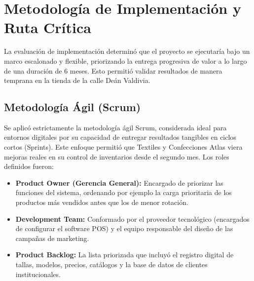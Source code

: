 \section{Metodología de Implementación y Ruta Crítica}

La evaluación de implementación determinó que el proyecto se ejecutaría bajo un marco escalonado y flexible, priorizando la entrega progresiva de valor a lo largo de una duración de 6 meses. Esto permitió validar resultados de manera temprana en la tienda de la calle Deán Valdivia.

\subsection{Metodología Ágil (Scrum)}
Se aplicó estrictamente la metodología ágil Scrum, considerada ideal para entornos digitales por su capacidad de entregar resultados tangibles en ciclos cortos (Sprints). Este enfoque permitió que Textiles y Confecciones Atlas viera mejoras reales en su control de inventarios desde el segundo mes. 
Los roles definidos fueron:
\begin{itemize}
    \item \textbf{Product Owner (Gerencia General):} Encargado de priorizar las funciones del sistema, ordenando por ejemplo la carga prioritaria de los productos más vendidos antes que los de menor rotación.
    \item \textbf{Development Team:} Conformado por el proveedor tecnológico (encargados de configurar el software POS) y el equipo responsable del diseño de las campañas de marketing.
    \item \textbf{Product Backlog:} La lista priorizada que incluyó el registro digital de tallas, modelos, precios, catálogos y la base de datos de clientes institucionales.
\end{itemize}

